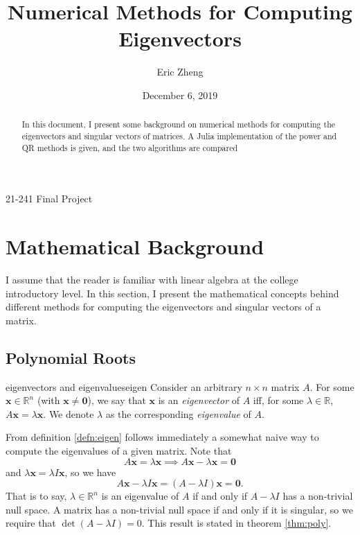 \documentclass{article}
\title{Numerical Methods for Computing Eigenvectors}
\author{Eric Zheng}
\date{December 6, 2019}
\makeatletter
\renewcommand{\maketitle}{
  \begin{center}
  {\vspace*{10mm}\LARGE\@title\par}
  {\vspace{7mm}\large\@author\par}
  {\vspace{1mm}21-241 Final Project\par}
  {\vspace{3mm}\large\@date\vspace{8mm}}
  \end{center}
}
\let\vec\mathbf
\makeatother
\begin{document}
\maketitle

\begin{abstract}
  In this document, I present some background on numerical methods for computing
  the eigenvectors and singular vectors of matrices. A Julia implementation of
  the power and QR methods is given, and the two algorithms are compared
\end{abstract}

\section{Mathematical Background}
I assume that the reader is familiar with linear algebra at the college introductory level. In this section, I present the mathematical concepts behind different methods for computing the eigenvectors and singular vectors of a matrix.

\subsection{Polynomial Roots}
\begin{definition}{eigenvectors and eigenvalues}{eigen}
  Consider an arbitrary $n \times n$ matrix $A$. For some $\vec{x} \in \mathbb{R}^n$ (with $\vec{x} \neq \vec{0}$), we say that $\vec{x}$ is an \textit{eigenvector} of $A$ iff, for some $\lambda \in \mathbb{R}$, $A\vec{x} = \lambda\vec{x}$. We denote $\lambda$ as the corresponding \textit{eigenvalue} of $A$.
\end{definition}

From definition \ref{defn:eigen} follows immediately a somewhat naive way to compute the eigenvalues of a given matrix. Note that
\begin{equation*}
  A\vec{x} = \lambda\vec{x} \implies A\vec{x} - \lambda\vec{x} = \vec{0}
\end{equation*}
and $\lambda\vec{x} = \lambda I \vec{x}$, so we have
\begin{equation*}
  A\vec{x} - \lambda I \vec{x} = (A - \lambda I)\vec{x} = \vec{0}.
\end{equation*}
That is to say, $\lambda \in \mathbb{R}^n$ is an eigenvalue of $A$ if and only if $A - \lambda I$ has a non-trivial null space. A matrix has a non-trivial null space if and only if it is singular, so we require that $\det(A - \lambda I) = 0$. This result is stated in theorem \ref{thm:poly}.
\end{document}
